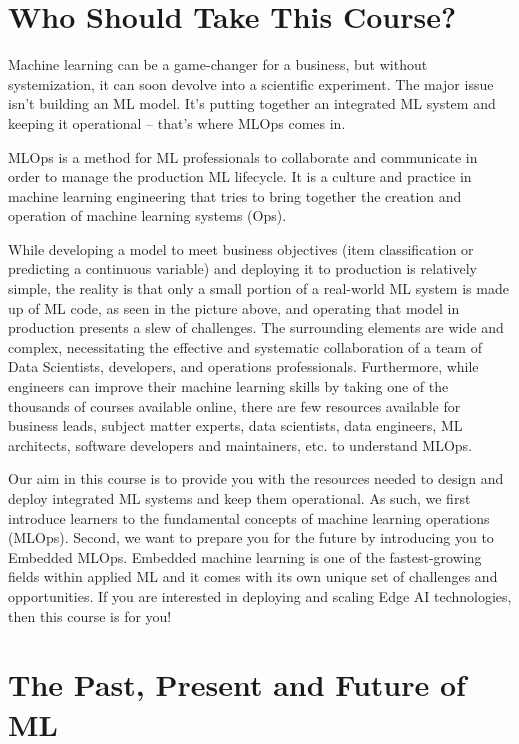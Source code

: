 \section{Who Should Take This Course?}


Machine learning can be a game-changer for a business, but without systemization, it can soon devolve into a scientific experiment. The major issue isn't building an ML model. It's putting together an integrated ML system and keeping it operational -- that’s where MLOps comes in.

MLOps is a method for ML professionals to collaborate and communicate in order to manage the production ML lifecycle. It is a culture and practice in machine learning engineering that tries to bring together the creation and operation of machine learning systems (Ops).

While developing a model to meet business objectives (item classification or predicting a continuous variable) and deploying it to production is relatively simple, the reality is that only a small portion of a real-world ML system is made up of ML code, as seen in the picture above, and operating that model in production presents a slew of challenges. The surrounding elements are wide and complex, necessitating the effective and systematic collaboration of a team of Data Scientists, developers, and operations professionals. Furthermore, while engineers can improve their machine learning skills by taking one of the thousands of courses available online, there are few resources available for business leads, subject matter experts, data scientists, data engineers, ML architects, software developers and maintainers, etc. to understand MLOps.

Our aim in this course is to provide you with the resources needed to design and deploy integrated ML systems and keep them operational. As such, we first introduce learners to the fundamental concepts of machine learning operations (MLOps). Second, we want to prepare you for the future by introducing you to Embedded MLOps. Embedded machine learning is one of the fastest-growing fields within applied ML and it comes with its own unique set of challenges and opportunities. If you are interested in deploying and scaling Edge AI technologies, then this course is for you!

\section{The Past, Present and Future of ML}

